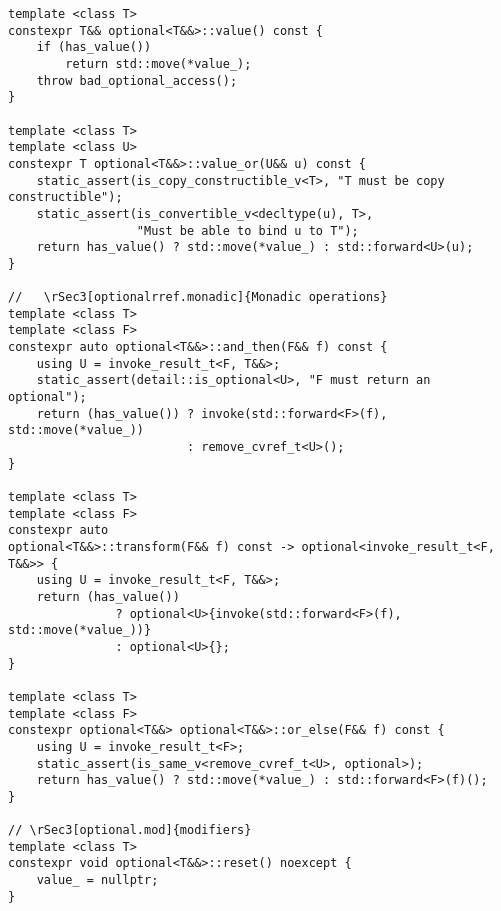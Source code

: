 \documentclass[a4paper,10pt,oneside,openany,final,article]{memoir}
\begin{document}
\begin{verbatim}
template <class T>
constexpr T&& optional<T&&>::value() const {
    if (has_value())
        return std::move(*value_);
    throw bad_optional_access();
}

template <class T>
template <class U>
constexpr T optional<T&&>::value_or(U&& u) const {
    static_assert(is_copy_constructible_v<T>, "T must be copy constructible");
    static_assert(is_convertible_v<decltype(u), T>,
                  "Must be able to bind u to T");
    return has_value() ? std::move(*value_) : std::forward<U>(u);
}

//   \rSec3[optionalrref.monadic]{Monadic operations}
template <class T>
template <class F>
constexpr auto optional<T&&>::and_then(F&& f) const {
    using U = invoke_result_t<F, T&&>;
    static_assert(detail::is_optional<U>, "F must return an optional");
    return (has_value()) ? invoke(std::forward<F>(f), std::move(*value_))
                         : remove_cvref_t<U>();
}

template <class T>
template <class F>
constexpr auto
optional<T&&>::transform(F&& f) const -> optional<invoke_result_t<F, T&&>> {
    using U = invoke_result_t<F, T&&>;
    return (has_value())
               ? optional<U>{invoke(std::forward<F>(f), std::move(*value_))}
               : optional<U>{};
}

template <class T>
template <class F>
constexpr optional<T&&> optional<T&&>::or_else(F&& f) const {
    using U = invoke_result_t<F>;
    static_assert(is_same_v<remove_cvref_t<U>, optional>);
    return has_value() ? std::move(*value_) : std::forward<F>(f)();
}

// \rSec3[optional.mod]{modifiers}
template <class T>
constexpr void optional<T&&>::reset() noexcept {
    value_ = nullptr;
}

\end{verbatim}
\end{document}
